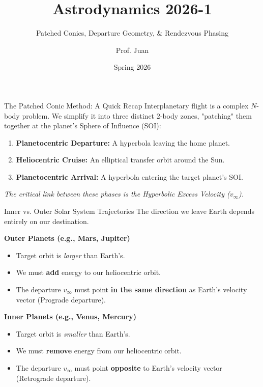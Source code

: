 \documentclass[11pt]{beamer}
\title[Interplanetary Trajectories]{Astrodynamics 2026-1}
\subtitle{Patched Conics, Departure Geometry, \& Rendezvous Phasing}
\author{Prof. Juan}
\institute{Aerospace Engineering Program}
\date{Spring 2026}
\begin{document}
\begin{frame}
    \titlepage
\end{frame}

\begin{frame}{The Patched Conic Method: A Quick Recap}
    Interplanetary flight is a complex $N$-body problem. We simplify it into three distinct $2$-body zones, "patching" them together at the planet's Sphere of Influence (SOI):
    
    \vspace{0.3cm}
    \begin{enumerate}
        \item \textbf{Planetocentric Departure:} A hyperbola leaving the home planet.
        \item \textbf{Heliocentric Cruise:} An elliptical transfer orbit around the Sun.
        \item \textbf{Planetocentric Arrival:} A hyperbola entering the target planet's SOI.
    \end{enumerate}
    
    \vspace{0.3cm}
    \textit{The critical link between these phases is the Hyperbolic Excess Velocity ($v_\infty$).}
\end{frame}

\begin{frame}{Inner vs. Outer Solar System Trajectories}
    The direction we leave Earth depends entirely on our destination.
    
    \vspace{0.3cm}
    \textbf{Outer Planets (e.g., Mars, Jupiter)}
    \begin{itemize}
        \item Target orbit is \textit{larger} than Earth's.
        \item We must \textbf{add} energy to our heliocentric orbit.
        \item The departure $v_\infty$ must point \textbf{in the same direction} as Earth's velocity vector (Prograde departure).
    \end{itemize}

    \vspace{0.3cm}
    \textbf{Inner Planets (e.g., Venus, Mercury)}
    \begin{itemize}
        \item Target orbit is \textit{smaller} than Earth's.
        \item We must \textbf{remove} energy from our heliocentric orbit.
        \item The departure $v_\infty$ must point \textbf{opposite} to Earth's velocity vector (Retrograde departure).
    \end{itemize}
\end{frame}
\end{document}
